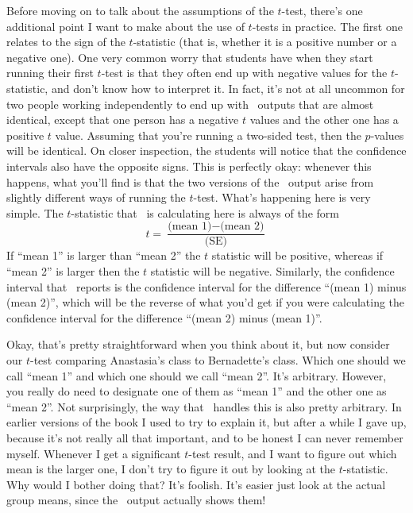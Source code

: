  

Before moving on to talk about the assumptions of the $t$-test, there's one additional point I want to make about the use of $t$-tests in practice. The first one relates to the sign of the $t$-statistic (that is, whether it is a positive number or a negative one).  One very common worry that students have when they start running their first $t$-test is that they often end up with negative values for the $t$-statistic, and don't know how to interpret it. In fact, it's not at all uncommon for two  people working independently to end up with \R\ outputs that are almost identical, except that one person has a negative $t$ values and the other one has a positive $t$ value. Assuming that  you're running a two-sided test, then the $p$-values will be identical. On closer inspection, the students will notice that the confidence intervals also have the opposite signs. This is perfectly okay: whenever this happens, what you'll find is that the two versions of the \R\ output arise from slightly different ways of running the $t$-test. What's happening here is very simple. The $t$-statistic that \R\ is calculating here is always of the form 
$$
t = \frac{\mbox{(mean 1)} -\mbox{(mean 2)}}{ \mbox{(SE)}}
$$
If ``mean 1'' is larger than ``mean 2'' the $t$ statistic will be positive, whereas if ``mean 2'' is larger then the $t$ statistic will be negative. Similarly, the confidence interval that \R\ reports is the confidence interval for the difference ``(mean 1) minus (mean 2)'', which will be the reverse of what you'd get if you were calculating the confidence interval for the difference ``(mean 2) minus (mean 1)''.

Okay, that's pretty straightforward when you think about it, but now consider our $t$-test comparing Anastasia's class to Bernadette's class. Which one should we call ``mean 1'' and which one should we call ``mean 2''. It's arbitrary. However, you really do need to designate one of them as ``mean 1'' and the other one as ``mean 2''. Not surprisingly, the way that \R\ handles this is also pretty arbitrary. In earlier versions of the book I used to try to explain it, but after a while I gave up, because it's not really all that important, and to be honest I can never remember myself. Whenever I get a significant $t$-test result, and I want to figure out which mean is the larger one, I don't try to figure it out by looking at the $t$-statistic. Why would I bother doing that? It's foolish. It's easier just look at the actual group means, since the \R\ output actually shows them!


